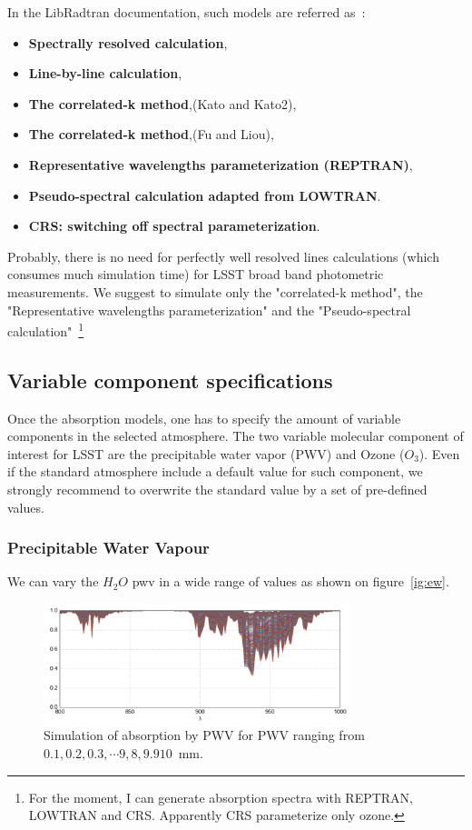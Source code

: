 \documentclass[a4paper]{article}
\begin{document}
In the LibRadtran documentation, such models are referred as~:
\begin{itemize}
\item {\bf Spectrally resolved  calculation},
\item {\bf Line-by-line calculation},
\item {\bf The correlated-k method},(Kato and Kato2),
\item {\bf The correlated-k method},(Fu and Liou),
\item {\bf Representative wavelengths parameterization (REPTRAN)},
\item {\bf Pseudo-spectral calculation adapted from LOWTRAN}. 
\item {\bf CRS: switching off spectral parameterization}. 
\end{itemize} 

Probably, there is no need for perfectly well resolved lines calculations (which consumes much simulation time) for LSST broad band photometric measurements.
We suggest to simulate only the "correlated-k method", the "Representative wavelengths parameterization" and the "Pseudo-spectral calculation"~\footnote{For the moment, I can generate absorption spectra with REPTRAN, LOWTRAN and CRS. Apparently CRS parameterize only ozone. }



\subsection{Variable component specifications}


Once the absorption models, one has to specify the amount of variable components in the selected atmosphere.
The two variable molecular component of interest for LSST are the precipitable water vapor (PWV) and Ozone ($O_3$).
Even if the standard atmosphere include a default value for such component, we strongly recommend to overwrite the standard value by a set of pre-defined values.


\subsubsection{Precipitable Water Vapour}


We can vary the $H_2O$ pwv in a wide range of values as shown on figure~\ref{ig:ew}.
\begin{figure}
\centering
\includegraphics[width=0.8\textwidth]{images/pwv}
\caption{\label{fig:ew}Simulation of absorption by PWV for PWV ranging from $0.1, 0.2,0.3, \cdots 9,8,9.910$~mm.}
\end{figure}
\end{document}
